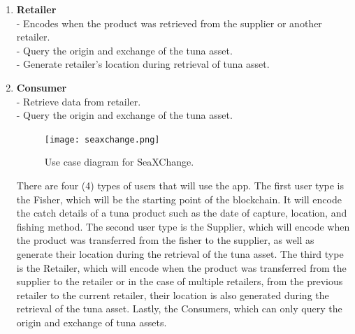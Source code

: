 \begin{itemize}
\begin{enumerate}
		\item \textbf{Retailer}
		\\- Encodes when the product was retrieved from the supplier or another retailer.
		\\- Query the origin and exchange of the tuna asset.
		\\- Generate retailer's location during retrieval of tuna asset.
		
		\item \textbf{Consumer}
		\\- Retrieve data from retailer.
		\\- Query the origin and exchange of the tuna asset.
		
		\begin{figure}[h]  
			\centering
			\texttt{[image: seaxchange.png]}
			\caption{Use case diagram for SeaXChange.}
			\label{fig:usecase}  
		\end{figure}
		
		There are four (4) types of users that will use the app. The first user type is the Fisher, which will be the starting point of the blockchain. It will encode the catch details of a tuna product such as the date of capture, location, and fishing method. The second user type is the Supplier, which will encode when the product was transferred from the fisher to the supplier, as well as generate their location during the retrieval of the tuna asset. The third type is the Retailer, which will encode when the product was transferred from the supplier to the retailer or in the case of multiple retailers, from the previous retailer to the current retailer, their location is also generated during the retrieval of the tuna asset. Lastly, the Consumers, which can only query the origin and exchange of tuna assets.
		
	\end{enumerate}
\end{itemize}